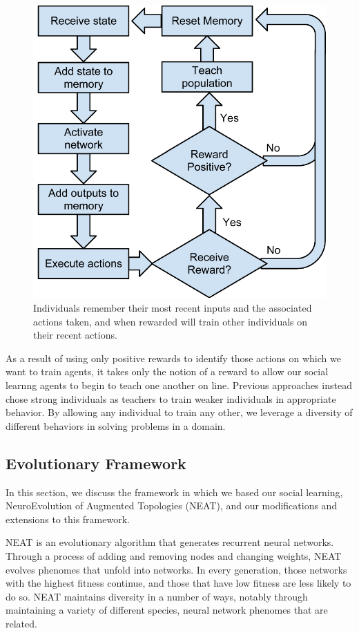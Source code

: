 \documentclass{acm_proc_article-sp}
\begin{document}
\begin{figure}
  \centering
    \includegraphics[scale=.6]{flowchart.pdf}
  \caption{Individuals remember their most recent inputs and the associated actions taken, and when rewarded will train other individuals on their recent actions.}
  \label{fig:flowchart}
\end{figure}


As a result of using only positive rewards to identify those actions on which we want to train agents, it takes only the notion of a reward to allow our social learnng agents to begin to teach one another on line. Previous approaches \cite{denaro1996cultural} instead chose strong individuals as teachers to train weaker individuals in appropriate behavior. By allowing any individual to train any other, we leverage a diversity of different behaviors in solving problems in a domain.

\subsection*{Evolutionary Framework}
In this section, we discuss the framework in which we based our social learning, NeuroEvolution of Augmented Topologies (NEAT)\cite{stanley2002evolving}, and our modifications and extensions to this framework.

NEAT is an evolutionary algorithm that generates recurrent neural networks.  Through a process of adding and removing nodes and changing weights, NEAT evolves phenomes that unfold into networks.  In every generation, those networks with the highest fitness continue, and those that have low fitness are less likely to do so.  NEAT maintains diversity in a number of ways, notably through maintaining a variety of different species, neural network phenomes that are related.  
\end{document}
